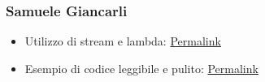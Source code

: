 \subsubsection*{Samuele Giancarli}
\begin{itemize}
    \item Utilizzo di stream e lambda: \href{https://github.com/MauroPello/OOP22-caesena/blob/main/src/main/java/it/unibo/caesena/view/components/meeple/RemainingMeeplesComponentImpl.java#L64}{Permalink}
    \item Esempio di codice leggibile e pulito: \href{https://github.com/MauroPello/OOP22-caesena/blob/e35a57ad5bd0b2fce619acdc5060cb8dc1d2d1e9/src/main/java/it/unibo/caesena/model/GameSetTileMediatorImpl.java#L123}{Permalink}
\end{itemize}
